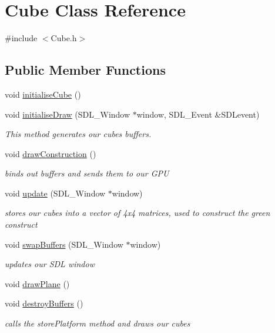 \hypertarget{class_cube}{}\section{Cube Class Reference}
\label{class_cube}


{\ttfamily \#include $<$Cube.\+h$>$}

\subsection*{Public Member Functions}
\begin{DoxyCompactItemize}
\item 
void \hyperlink{class_cube_af16246e0a4e54ff119e13393c6bab000}{initialise\+Cube} ()
\item 
void \hyperlink{class_cube_a7e966b965cb7a6e62f5883a7239a3d8b}{initialise\+Draw} (S\+D\+L\+\_\+\+Window $\ast$window, S\+D\+L\+\_\+\+Event \&S\+D\+Levent)
\begin{DoxyCompactList}\small\item\em This method generates our cubes buffers. \end{DoxyCompactList}\item 
void \hyperlink{class_cube_a0848c4e700994fad4aa42cb573dcd4d3}{draw\+Construction} ()
\begin{DoxyCompactList}\small\item\em binds out buffers and sends them to our G\+P\+U \end{DoxyCompactList}\item 
void \hyperlink{class_cube_aaaf061a108b080549a0cfd21fbca2164}{update} (S\+D\+L\+\_\+\+Window $\ast$window)
\begin{DoxyCompactList}\small\item\em stores our cubes into a vector of 4x4 matrices, used to construct the green construct \end{DoxyCompactList}\item 
void \hyperlink{class_cube_a63b168885f4b46f818dcaec902ad2817}{swap\+Buffers} (S\+D\+L\+\_\+\+Window $\ast$window)
\begin{DoxyCompactList}\small\item\em updates our S\+D\+L window \end{DoxyCompactList}\item 
void \hyperlink{class_cube_a6bc54df8a2e5a47026fba5b7a6732db8}{draw\+Plane} ()
\item 
void \hyperlink{class_cube_ab5edd4c30271741b1fe001290b7ceb2e}{destroy\+Buffers} ()
\begin{DoxyCompactList}\small\item\em calls the store\+Platform method and draws our cubes \end{DoxyCompactList}\end{DoxyCompactItemize}


